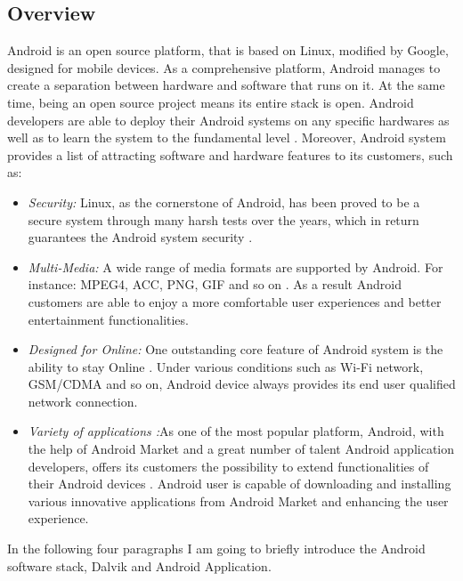 \subsection{Overview}
Android is an open source platform, that is based on Linux, modified by Google, designed for mobile devices. As a comprehensive platform, Android manages to create a separation between hardware and software that runs on it.  At the same time, being an open source project means its entire stack is open. Android developers are able to deploy their Android systems on any specific hardwares as well as to learn the system to the fundamental level \cite{learn_android}.
Moreover, Android system provides a list of attracting software and hardware features to its customers, such as:
\begin{itemize}
\item \emph{Security:} Linux, as the cornerstone of Android, has been proved to be a secure system through many harsh tests over the years, which in return guarantees the Android system security \cite{learn_android}.
\item \emph{Multi-Media:} A wide range of media formats are supported by Android. For instance: MPEG4, ACC, PNG, GIF and so on \cite{android_media}. As a result Android customers are able to enjoy a more comfortable user experiences and better entertainment functionalities.
\item \emph{Designed for Online:} One outstanding core feature of Android system is the ability to stay Online \cite{android_forensics}. Under various conditions such as Wi-Fi network, GSM/CDMA and so on, Android device always provides its end user qualified network connection.
\item \emph{Variety of applications :}As one of the most popular platform,  Android, with the help of Android Market and a great number of talent Android application developers, offers its customers the possibility to extend  functionalities of their Android devices \cite{android_forensics}. Android user is capable of downloading and installing various innovative applications from Android Market and enhancing the user experience.
\end{itemize}

In the following four paragraphs I am going to briefly introduce the Android software stack, Dalvik and Android Application.

